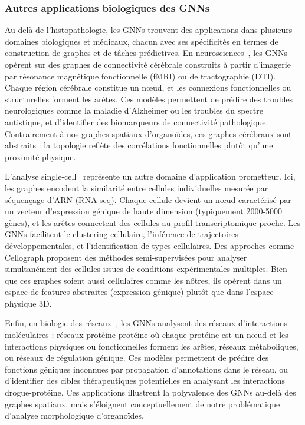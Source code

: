 \subsubsection{Autres applications biologiques des GNNs}

Au-delà de l'histopathologie, les GNNs trouvent des applications dans plusieurs domaines biologiques et médicaux, chacun avec ses spécificités en termes de construction de graphes et de tâches prédictives. En neurosciences~\cite{Luo2024,Bessadok2022}, les GNNs opèrent sur des graphes de connectivité cérébrale construits à partir d'imagerie par résonance magnétique fonctionnelle (fMRI) ou de tractographie (DTI). Chaque région cérébrale constitue un nœud, et les connexions fonctionnelles ou structurelles forment les arêtes. Ces modèles permettent de prédire des troubles neurologiques comme la maladie d'Alzheimer ou les troubles du spectre autistique, et d'identifier des biomarqueurs de connectivité pathologique. Contrairement à nos graphes spatiaux d'organoïdes, ces graphes cérébraux sont abstraits : la topologie reflète des corrélations fonctionnelles plutôt qu'une proximité physique.

L'analyse single-cell~\cite{Shahir2024} représente un autre domaine d'application prometteur. Ici, les graphes encodent la similarité entre cellules individuelles mesurée par séquençage d'ARN (RNA-seq). Chaque cellule devient un nœud caractérisé par un vecteur d'expression génique de haute dimension (typiquement 2000-5000 gènes), et les arêtes connectent des cellules au profil transcriptomique proche. Les GNNs facilitent le clustering cellulaire, l'inférence de trajectoires développementales, et l'identification de types cellulaires. Des approches comme Cellograph proposent des méthodes semi-supervisées pour analyser simultanément des cellules issues de conditions expérimentales multiples. Bien que ces graphes soient aussi cellulaires comme les nôtres, ils opèrent dans un espace de features abstraites (expression génique) plutôt que dans l'espace physique 3D.

Enfin, en biologie des réseaux~\cite{Zhang2021GNN}, les GNNs analysent des réseaux d'interactions moléculaires : réseaux protéine-protéine où chaque protéine est un nœud et les interactions physiques ou fonctionnelles forment les arêtes, réseaux métaboliques, ou réseaux de régulation génique. Ces modèles permettent de prédire des fonctions géniques inconnues par propagation d'annotations dans le réseau, ou d'identifier des cibles thérapeutiques potentielles en analysant les interactions drogue-protéine. Ces applications illustrent la polyvalence des GNNs au-delà des graphes spatiaux, mais s'éloignent conceptuellement de notre problématique d'analyse morphologique d'organoïdes.

